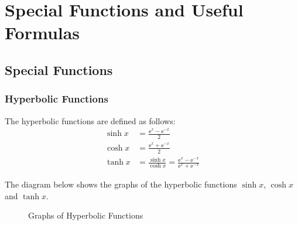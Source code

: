 \chapter{Special Functions and Useful Formulas}

\section{Special Functions}

\subsection{Hyperbolic Functions}
The hyperbolic functions are defined as follows:
\begin{align}
    \sinh x & = \frac{\ee^x - \ee^{-x}}{2} \\
    \cosh x & = \frac{\ee^x + \ee^{-x}}{2} \\
    \tanh x & = \frac{\sinh x}{\cosh x} = \frac{\ee^x - \ee^{-x}}{\ee^x + \ee^{-x}}
\end{align}

The diagram below shows the graphs of the hyperbolic functions $\sinh x$, $\cosh x$ and $\tanh x$.
\begin{figure}[h!]
    \centering
    \caption{Graphs of Hyperbolic Functions}
    \label{fig:hyperbolic_functions}
\end{figure}

